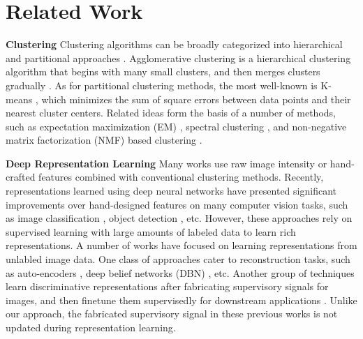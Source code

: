 \documentclass[10pt,twocolumn,letterpaper]{article}
\begin{document}
\section{Related Work}
\vspace{-5pt}
\noindent \textbf{Clustering}
Clustering algorithms can be {broadly} categorized into hierarchical and {partitional} approaches \cite{jain1999data}. {Agglomerative clustering is a hierarchical clustering algorithm that begins with many {small} clusters, and then merges clusters gradually \cite{gowda1978agglomerative,kurita1991efficient, gdalyahu2001self}}. As for partitional clustering methods, the most well-known is K-means \cite{macqueen1967some}, which minimizes the sum {of} square errors between data points and their nearest cluster centers. {Related ideas form the basis of a number of methods, such as expectation maximization (EM) \cite{dempster1977maximum, mclachlan2004finite}, spectral clustering \cite{ng2002spectral, zelnik2004self, shi2000normalized}, {and} non-negative matrix factorization (NMF) based clustering \cite{ding2010convex, cai2009locality, zafeiriou2010nonlinear}.}

\noindent \textbf{Deep Representation Learning}
Many works {use} raw image intensity or hand-crafted features \cite{singh2012unsupervised,doersch2013mid,hariharan2012discriminative,han2015unsupervised,rematas2015dataset,huang2012affinity} combined with conventional clustering methods. Recently, representations learned using deep neural networks have presented {significant improvements over} {hand-designed} features on many computer vision tasks, such as image classification \cite{krizhevsky2012imagenet,sermanet2013overfeat,simonyan2014very,russakovsky2014imagenet}, object detection \cite{girshick2014rich,girshick2015fast,he2014spatial,ren2015faster}, etc. However, these approaches rely on {supervised learning with large amounts of labeled data to learn rich representations}. {A number of works have} focused on learning representations from unlabled image data. One class of approaches cater to reconstruction tasks, such as auto-encoders \cite{ranzato2007unsupervised, hinton2006reducing, vincent2008extracting, krizhevsky2011using, lee2009convolutional}, deep belief networks (DBN) \cite{le2013building}, etc. Another group of techniques learn discriminative representations after fabricating supervisory signals for images, and then finetune them supervisedly for downstream applications \cite{dosovitskiy2014discriminative, doersch2015unsupervised, wang2015unsupervised}. {Unlike our approach, the fabricated supervisory signal in these previous works is not} updated during representation learning.
\end{document}

